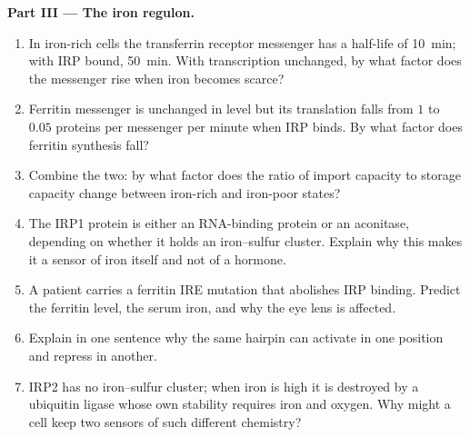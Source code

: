 \begin{problem}
\medskip
\noindent\textbf{Part III --- The iron regulon.}
\begin{enumerate}[resume]
  \item In iron-rich cells the transferrin receptor messenger has a
        half-life of \qty{10}{min}; with IRP bound, \qty{50}{min}.
        With transcription unchanged, by what factor does the messenger
        rise when iron becomes scarce?
  \item Ferritin messenger is unchanged in level but its translation
        falls from $1$ to $0.05$ proteins per messenger per minute when
        IRP binds. By what factor does ferritin synthesis fall?
  \item Combine the two: by what factor does the ratio of import
        capacity to storage capacity change between iron-rich and
        iron-poor states?
  \item The IRP1 protein is either an RNA-binding protein or an
        aconitase, depending on whether it holds an iron--sulfur
        cluster. Explain why this makes it a sensor of iron itself
        and not of a hormone.
  \item A patient carries a ferritin IRE mutation that abolishes IRP
        binding. Predict the ferritin level, the serum iron, and why
        the eye lens is affected.
  \item Explain in one sentence why the same hairpin can activate in
        one position and repress in another.
  \item IRP2 has no iron--sulfur cluster; when iron is high it is
        destroyed by a ubiquitin ligase whose own stability requires
        iron and oxygen. Why might a cell keep two sensors of such
        different chemistry?
\end{enumerate}


\end{problem}

